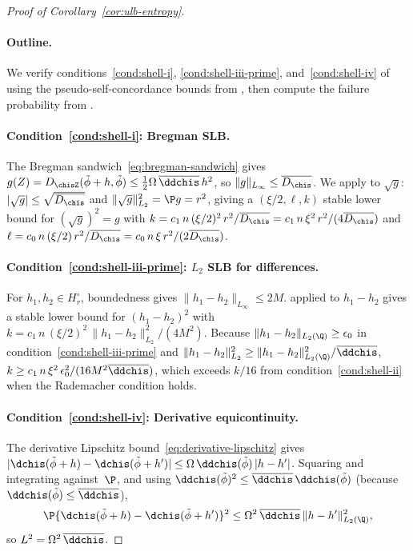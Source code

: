 \documentclass{article}
\begin{document}
\begin{proof}[Proof of Corollary~\ref{cor:ulb-entropy}]
\paragraph{Outline.}
We verify conditions~\ref{cond:shell-i}, \ref{cond:shell-iii-prime}, and~\ref{cond:shell-iv}
of 
using the pseudo-self-concordance bounds
from ,
then compute the failure probability
from .

\paragraph{Condition~\ref{cond:shell-i}: Bregman SLB.}
The Bregman sandwich~\eqref{eq:bregman-sandwich}
gives $g(Z) = D_{\chisZ}(\tilde\phi+h,\tilde\phi)
  \le \frac{1}{2}\Omega\,\overline{\ddchis}\, h^2$,
so $\|g\|_{L_\infty} \le \overline{D_{\chis}}$.
We apply  to $\sqrt{g}$:
$|\sqrt{g}| \le \sqrt{\overline{D_{\chis}}}$
and $\|\sqrt{g}\|_{L_2}^2 = \P g = r^2$,
giving a $(\xi/2, \ell, k)$
stable lower bound for $(\sqrt{g})^2 = g$
with
$k = c_1\, n\, (\xi/2)^2\, r^2/\overline{D_{\chis}}
  = c_1\, n\, \xi^2\, r^2/(4\overline{D_{\chis}})$
and
$\ell = c_0\, n\, (\xi/2)\, r^2/\overline{D_{\chis}}
  = c_0\, n\, \xi\, r^2/(2\overline{D_{\chis}})$.

\paragraph{Condition~\ref{cond:shell-iii-prime}: $L_2$ SLB for differences.}
For $h_1, h_2 \in H_r^\circ$,
boundedness gives $\|h_1-h_2\|_{L_\infty} \le 2M$.
applied to $h_1 - h_2$
gives a stable lower bound for $(h_1-h_2)^2$
with
$k = c_1\, n\, (\xi/2)^2\,
  \|h_1-h_2\|_{L_2}^2 / (4M^2)$.
Because $\|h_1 - h_2\|_{L_2(\Q)} \ge \epsilon_0$
in condition~\ref{cond:shell-iii-prime}
and $\|h_1 - h_2\|_{L_2}^2 \ge \|h_1 - h_2\|_{L_2(\Q)}^2/\overline{\ddchis}$,
$k \ge c_1\, n\, \xi^2\, \epsilon_0^2/(16M^2\overline{\ddchis})$,
which exceeds $k/16$ from condition~\ref{cond:shell-ii}
when the Rademacher condition holds.

\paragraph{Condition~\ref{cond:shell-iv}: Derivative equicontinuity.}
The derivative Lipschitz
bound~\eqref{eq:derivative-lipschitz}
gives
$|\dchis(\tilde\phi+h) - \dchis(\tilde\phi+h')|
  \le \Omega\, \ddchis(\tilde\phi)\, |h-h'|$.
Squaring and integrating against~$\P$,
and using
$\ddchis(\tilde\phi)^2
  \le \overline{\ddchis}\, \ddchis(\tilde\phi)$
(because $\ddchis(\tilde\phi) \le \overline{\ddchis}$),
\[
\P\{\dchis(\tilde\phi+h)
  - \dchis(\tilde\phi+h')\}^2
  \le \Omega^2\, \overline{\ddchis}\,
    \|h-h'\|_{L_2(\Q)}^2,
\]
so $L^2 = \Omega^2\, \overline{\ddchis}$.


\end{proof}
\end{document}
